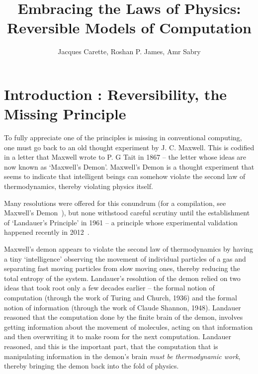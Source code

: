 \documentclass{article}
\title{Embracing the Laws of Physics: \\ Reversible Models of Computation}
\author{Jacques Carette, Roshan P. James, Amr Sabry}
\begin{document}
\maketitle









\section{Introduction : Reversibility, the Missing Principle}

To fully appreciate one of the principles is missing in conventional computing,
one must go back to an old thought experiment by J. C. Maxwell. This is
codified in a letter that Maxwell wrote to P. G Tait in 1867 --
the letter whose ideas are now known as `Maxwell's
Demon'. Maxwell's Demon is a thought experiment that seems to
indicate that intelligent beings can somehow violate the second law of
thermodynamics, thereby violating physics itself.

Many resolutions were offered for this conundrum (for a compilation, see
Maxwell's Demon~\cite{leff1990}), but none withstood careful
scrutiny until the establishment of `Landauer's Principle' in 1961 -- a
principle whose experimental validation
happened recently in 2012~\cite{berut2012experimental}.

Maxwell's demon appears to violate the second law of thermodynamics by
having a tiny `intelligence' observing the movement of individual
particles of a gas and separating fast moving particles from slow
moving ones, thereby reducing the total entropy of the
system. Landauer's resolution of the demon relied on two ideas that
took root only a few decades earlier -- the formal notion of
computation (through the work of Turing and Church, 1936) and the
formal notion of information (through the work of Claude Shannon,
1948). Landauer reasoned that the computation done by the finite brain
of the demon, involves getting information about the movement of
molecules, acting on that information and then overwriting it to make
room for the next computation.  Landauer reasoned, and this is the
important part, that the computation that is manipulating information
in the demon's brain \textit{must be thermodynamic work}, thereby
bringing the demon back into the fold of physics.
\end{document}
